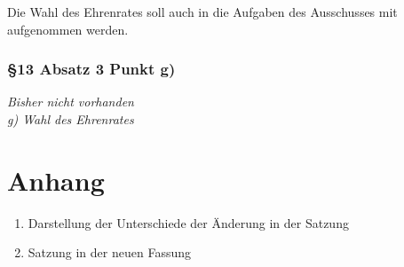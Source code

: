 \documentclass[10pt,a4paper,parskip=half]{scrartcl}
\newcommand{\change}[1]{
  \begin{adjustwidth}{20pt}{20pt}
    #1
  \end{adjustwidth}
}
\newcommand{\compare}[3]{\change{\subsubsection*{#1}\begin{multicols}{2}#2\columnbreak\\#3\end{multicols}}}
\begin{document}
Die Wahl des Ehrenrates soll auch in die Aufgaben des Ausschusses mit aufgenommen werden.

\compare{§13 Absatz 3 Punkt g)}{
  \em Bisher nicht vorhanden \em
} {
  g) Wahl des Ehrenrates
}


\section{Anhang}
\begin{enumerate}
  \item Darstellung der Unterschiede der Änderung in der Satzung
  \item Satzung in der neuen Fassung
\end{enumerate}



\end{document}

